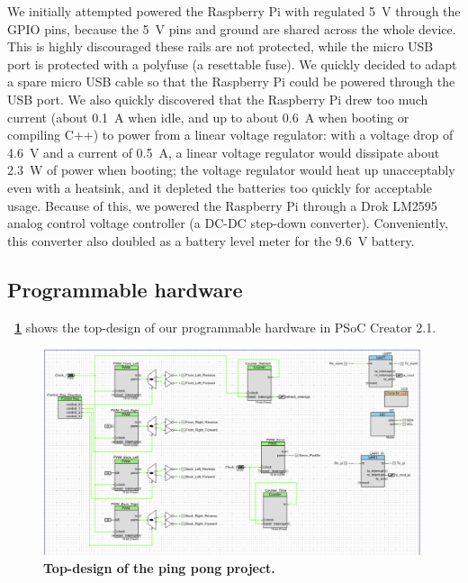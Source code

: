 \documentclass[letterpaper, 11pt]{article}
\newcommand*{\figref}[1]{\textbf{\figurename~\ref{#1}}}
\begin{document}
\begin{enumerate}[label=\textbf{\arabic*.}]
We initially attempted powered the Raspberry Pi with regulated \SI{5}{V} through the GPIO pins, because the \SI{5}{V} pins and ground are shared across the whole device. This is highly discouraged these rails are not protected, while the micro USB port is protected with a polyfuse (a resettable fuse). We quickly decided to adapt a spare micro USB cable so that the Raspberry Pi could be powered through the USB port. We also quickly discovered that the Raspberry Pi drew too much current (about \SI{0.1}{A} when idle, and up to about \SI{0.6}{A} when booting or compiling C++) to power from a linear voltage regulator: with a voltage drop of \SI{4.6}{V} and a current of \SI{0.5}{A}, a linear voltage regulator would dissipate about \SI{2.3}{W} of power when booting; the voltage regulator would heat up unacceptably even with a heatsink, and it depleted the batteries too quickly for acceptable usage. Because of this, we powered the Raspberry Pi through a Drok LM2595 analog control voltage controller (a DC-DC step-down converter). Conveniently, this converter also doubled as a battery level meter for the \SI{9.6}{V} battery.

\subsection{Programmable hardware}
\figref{fig:topdesign} shows the top-design of our programmable hardware in PSoC Creator 2.1.
\begin{figure}[ht]
    \centering
    \includegraphics[width=0.99\textwidth]{images/topdesign.pdf}
    \caption{\textbf{Top-design of the ping pong project.}}
    \label{fig:topdesign}
\end{figure}


\end{enumerate}
\end{document}
